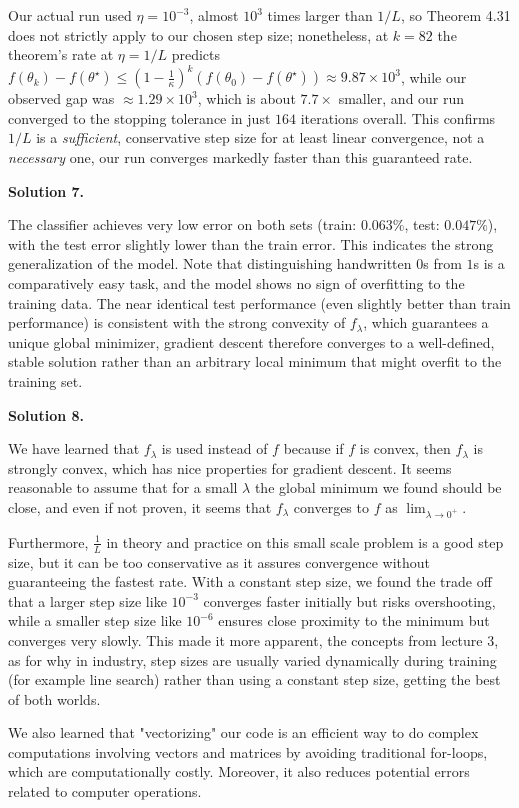 \documentclass[12pt]{article}
\newcommand{\solution}[1]{\vspace{1em}\noindent \textbf{Solution #1.}\par}
\begin{document}
Our actual run used $\eta = 10^{-3}$, almost $10^3$ times larger than $1/L$, so Theorem 4.31 does not strictly apply to our chosen step size; nonetheless, at $k=82$ the theorem's rate at $\eta=1/L$ predicts $f(\theta_k)-f(\theta^\star) \leq \left(1-\tfrac{1}{\kappa}\right)^k(f(\theta_0)-f(\theta^\star)) \approx 9.87\times10^3$, while our observed gap was $\approx 1.29\times10^3$, which is about $7.7\times$ smaller, and our run converged to the stopping tolerance in just $164$ iterations overall. This confirms $1/L$ is a \emph{sufficient}, conservative step size for at least linear convergence, not a \emph{necessary} one, our run converges markedly faster than this guaranteed rate.

\solution{7}

The classifier achieves very low error on both sets (train: $0.063\%$, test: $0.047\%$), with the test error slightly lower than the train error. This indicates the strong generalization of the model. Note that distinguishing handwritten $0$s from $1$s is a comparatively easy task, and the model shows no sign of overfitting to the training data. The near identical test performance (even slightly better than train performance) is consistent with the strong convexity of $f_\lambda$, which guarantees a unique global minimizer, gradient descent therefore converges to a well-defined, stable solution rather than an arbitrary local minimum that might overfit to the training set.

\solution{8}
We have learned that $f_\lambda$ is used instead of $f$ because if $f$ is convex, then $f_\lambda$ is strongly convex, which has nice properties for gradient descent. It seems reasonable to assume that for a small $\lambda$ the global minimum we found should be close, and even if not proven, it seems that $f_\lambda$ converges to $f$ as $\lim_{\lambda \to 0^+}$.

Furthermore, $\frac{1}{L}$ in theory and practice on this small scale problem is a good step size, but it can be too conservative as it assures convergence without guaranteeing the fastest rate. With a constant step size, we found the trade off that a larger step size like $10^{-3}$ converges faster initially but risks overshooting, while a smaller step size like $10^{-6}$ ensures close proximity to the minimum but converges very slowly. This made it more apparent, the concepts from lecture 3, as for why in industry, step sizes are usually varied dynamically during training (for example line search) rather than using a constant step size, getting the best of both worlds.

We also learned that "vectorizing" our code is an efficient way to do complex computations involving vectors and matrices by avoiding traditional for-loops, which are computationally costly. Moreover, it also reduces potential errors related to computer operations.
\end{document}
